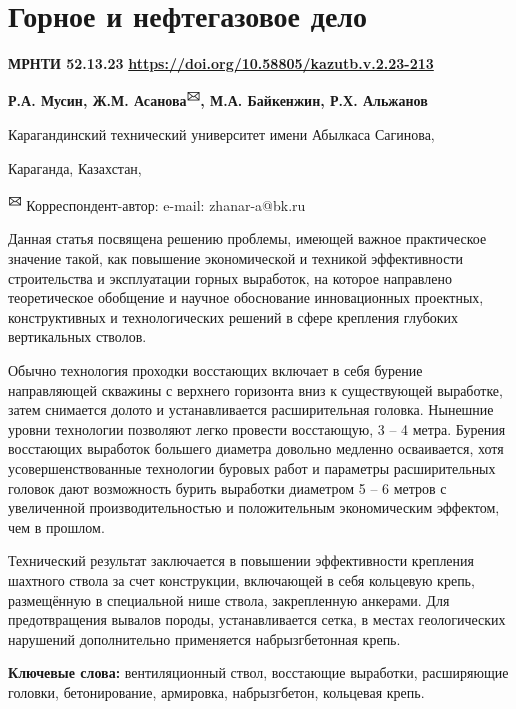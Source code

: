 \let\cleardoublepage\clearpage
\chapter{Горное и нефтегазовое дело}

{\bfseries МРНТИ 52.13.23}
\hfill {\bfseries \href{https://doi.org/10.58805/kazutb.v.2.23-213}{https://doi.org/10.58805/kazutb.v.2.23-213}}


\begin{center}
{\bfseries Р.А. Мусин, Ж.М. Асанова\textsuperscript{🖂}, М.А. Байкенжин, Р.Х. Альжанов}

Карагандинский технический университет имени Абылкаса Сагинова,

Караганда, Казахстан,

{\bfseries \textsuperscript{🖂}} Корреспондент-автор: e-mail: zhanar-a@bk.ru
\end{center}

Данная статья посвящена решению проблемы, имеющей важное практическое
значение такой, как повышение экономической и техникой эффективности
строительства и эксплуатации горных выработок, на которое направлено
теоретическое обобщение и научное обоснование инновационных проектных,
конструктивных и технологических решений в сфере крепления глубоких
вертикальных стволов.

Обычно технология проходки восстающих включает в себя бурение
направляющей скважины с верхнего горизонта вниз к существующей
выработке, затем снимается долото и устанавливается расширительная
головка. Нынешние уровни технологии позволяют легко провести восстающую,
3 -- 4 метра. Бурения восстающих выработок большего диаметра довольно
медленно осваивается, хотя усовершенствованные технологии буровых работ
и параметры расширительных головок дают возможность бурить выработки
диаметром 5 -- 6 метров с увеличенной производительностью и
положительным экономическим эффектом, чем в прошлом.

Технический результат заключается в повышении эффективности крепления
шахтного ствола за счет конструкции, включающей в себя кольцевую крепь,
размещённую в специальной нише ствола, закрепленную анкерами. Для
предотвращения вывалов породы, устанавливается сетка, в местах
геологических нарушений дополнительно применяется набрызгбетонная крепь.

{\bfseries Ключевые слова:} вентиляционный ствол, восстающие выработки,
расширяющие головки, бетонирование, армировка, набрызгбетон, кольцевая
крепь.


